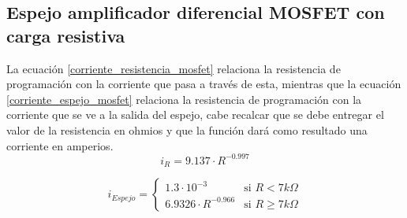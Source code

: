 \subsection{Espejo amplificador diferencial MOSFET con carga resistiva}
La ecuación \ref{corriente_resistencia_mosfet} relaciona la resistencia de programación con la corriente que pasa a través de esta, mientras que la ecuación \ref{corriente_espejo_mosfet} relaciona la resistencia de programación con la corriente que se ve a la salida del espejo, cabe recalcar que se debe entregar el valor de la resistencia en ohmios y que la función dará como resultado una corriente en amperios. \\

\begin{equation}\label{corriente_resistencia_mosfet}
i_R=9.137\cdot R^{-0.997}
\end{equation}

\begin{equation}\label{corriente_espejo_mosfet}
  i_{Espejo} = 
  \begin{cases}
  1.3\cdot 10^{-3}       & \text{si $R < 7k\Omega$}    \\
  6.9326\cdot R^{-0.966} & \text{si $R \geq 7k\Omega$} 
  \end{cases}
\end{equation}

